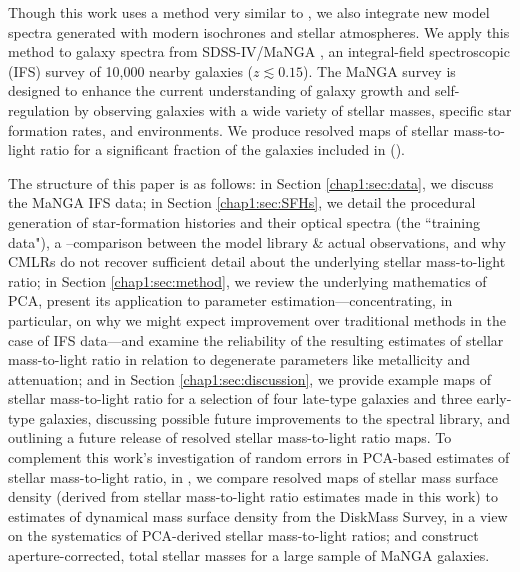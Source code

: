 Though this work uses a method very similar to , we also integrate new model spectra generated with modern isochrones and stellar atmospheres. We apply this method to galaxy spectra from SDSS-IV/MaNGA \citep[Mapping Nearby Galaxies at Apache Point Observatory,][]{bundy15_manga}, an integral-field spectroscopic (IFS) survey of 10,000 nearby galaxies ($z \lesssim 0.15$). The MaNGA survey is designed to enhance the current understanding of galaxy growth and self-regulation by observing galaxies with a wide variety of stellar masses, specific star formation rates, and environments. We produce resolved maps of stellar mass-to-light ratio for a significant fraction of the \mplvngal galaxies included in \mplvfull (\mplv).

The structure of this paper is as follows: in Section \ref{chap1:sec:data}, we discuss the MaNGA IFS data; in Section \ref{chap1:sec:SFHs}, we detail the procedural generation of star-formation histories and their optical spectra (the ``training data"), a \Dn--\HdeltaA comparison between the model library \& actual observations, and why CMLRs do not recover sufficient detail about the underlying stellar mass-to-light ratio; in Section \ref{chap1:sec:method}, we review the underlying mathematics of PCA, present its application to parameter estimation---concentrating, in particular, on why we might expect improvement over traditional methods in the case of IFS data---and examine the reliability of the resulting estimates of stellar mass-to-light ratio in relation to degenerate parameters like metallicity and attenuation; and in Section \ref{chap1:sec:discussion}, we provide example maps of stellar mass-to-light ratio for a selection of four late-type galaxies and three early-type galaxies, discussing possible future improvements to the spectral library, and outlining a future release of resolved stellar mass-to-light ratio maps. To complement this work's investigation of random errors in PCA-based estimates of stellar mass-to-light ratio, in \citet[][hereafter ]{pace_19b_pca}, we compare resolved maps of stellar mass surface density (derived from stellar mass-to-light ratio estimates made in this work) to estimates of dynamical mass surface density from the DiskMass Survey, in a view on the systematics of PCA-derived stellar mass-to-light ratios; and construct aperture-corrected, total stellar masses for a large sample of MaNGA galaxies.